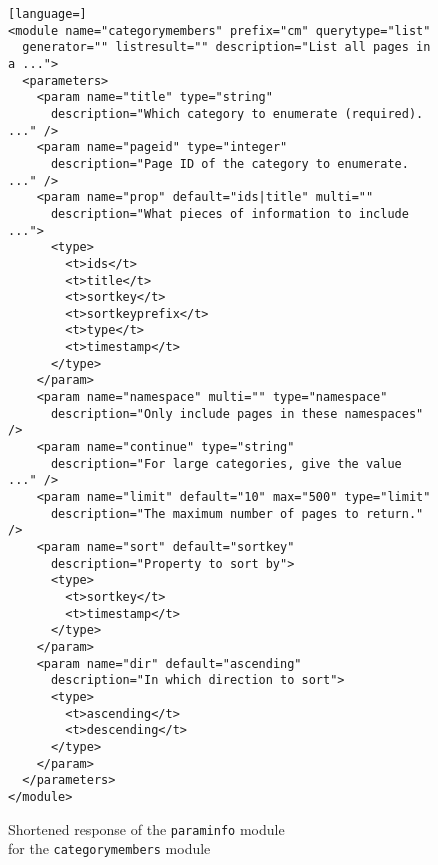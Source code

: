 \begin{figure}[p]

\begin{lstlisting}[language=]
<module name="categorymembers" prefix="cm" querytype="list"
  generator="" listresult="" description="List all pages in a ...">
  <parameters>
    <param name="title" type="string" 
      description="Which category to enumerate (required). ..." />
    <param name="pageid" type="integer" 
      description="Page ID of the category to enumerate. ..." />
    <param name="prop" default="ids|title" multi=""
      description="What pieces of information to include ...">
      <type>
        <t>ids</t>
        <t>title</t>
        <t>sortkey</t>
        <t>sortkeyprefix</t>
        <t>type</t>
        <t>timestamp</t>
      </type>
    </param>
    <param name="namespace" multi="" type="namespace"
      description="Only include pages in these namespaces" />
    <param name="continue" type="string"
      description="For large categories, give the value ..." />
    <param name="limit" default="10" max="500" type="limit" 
      description="The maximum number of pages to return." />
    <param name="sort" default="sortkey"
      description="Property to sort by">
      <type>
        <t>sortkey</t>
        <t>timestamp</t>
      </type>
    </param>
    <param name="dir" default="ascending"
      description="In which direction to sort">
      <type>
        <t>ascending</t>
        <t>descending</t>
      </type>
    </param>
  </parameters>
</module>
\end{lstlisting}

\caption{Shortened response of the \texttt{paraminfo} module \\ for the \texttt{category\-members} module}
\label{paraminfo sample}
\end{figure}